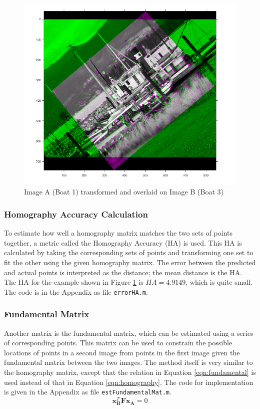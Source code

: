 \documentclass[a4paper, 10pt, conference]{ieeeconf}
\begin{document}
\begin{figure}[!ht]
  \centering
  \includegraphics[width=0.75\linewidth]{pic/q2_1_b4_1_3_pair}
  \caption{Image A (Boat 1) transformed and overlaid on Image B (Boat 3)}
  \label{fig:boat13}
  \vspace{-0.5cm}
\end{figure}

\subsubsection{Homography Accuracy Calculation}
To estimate how well a homography matrix matches the two sets of points together, a metric called the Homography Accuracy (HA) is used. This HA is calculated by taking the corresponding sets of points and transforming one set to fit the other using the given homography matrix. The error between the predicted and actual points is interpreted as the distance; the mean distance is the HA. The HA for the example shown in Figure \ref{fig:boat13} is $HA=4.9149$, which is quite small. The code is in the Appendix as file \texttt{errorHA.m}.

\subsubsection{Fundamental Matrix}
Another matrix is the fundamental matrix, which can be estimated using a series of corresponding points. This matrix can be used to constrain the possible locations of points in a second image from points in the first image given the fundamental matrix between the two images. The method itself is very similar to the homography matrix, except that the relation in Equation \ref{eqn:fundamental} is used instead of that in Equation \ref{eqn:homography}. The code for implementation is given in the Appendix as file \texttt{estFundamentalMat.m}.
\vspace{-0.15cm}
\begin{equation} \label{eqn:fundamental}
    \textbf{x}_\textbf{B}^T\textbf{Fx}_\textbf{A} = 0
\end{equation}
\vspace{-0.5cm}
\end{document}
